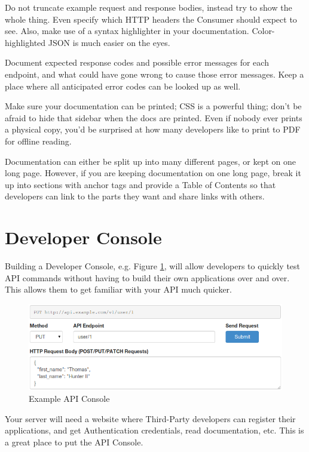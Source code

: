 \documentclass{book}
\begin{document}
Do not truncate example request and response bodies, instead try to show the whole thing. Even specify which HTTP headers the Consumer should expect to see. Also, make use of a syntax highlighter in your documentation. Color-highlighted JSON is much easier on the eyes.

Document expected response codes and possible error messages for each endpoint, and what could have gone wrong to cause those error messages. Keep a place where all anticipated error codes can be looked up as well.

Make sure your documentation can be printed; CSS is a powerful thing; don't be afraid to hide that sidebar when the docs are printed. Even if nobody ever prints a physical copy, you'd be surprised at how many developers like to print to PDF for offline reading.

Documentation can either be split up into many different pages, or kept on one long page. However, if you are keeping documentation on one long page, break it up into sections with anchor tags and provide a Table of Contents so that developers can link to the parts they want and share links with others.


\section{Developer Console}

Building a Developer Console, e.g. Figure \ref{fig:devconsole}, will allow developers to quickly test API commands without having to build their own applications over and over. This allows them to get familiar with your API much quicker.

\begin{figure}[ht!]
\centering
\includegraphics[width=120mm]{images/api-console.png}
\caption{Example API Console}
\label{fig:devconsole}
\end{figure}

Your server will need a website where Third-Party developers can register their applications, and get Authentication credentials, read documentation, etc. This is a great place to put the API Console.
\end{document}
